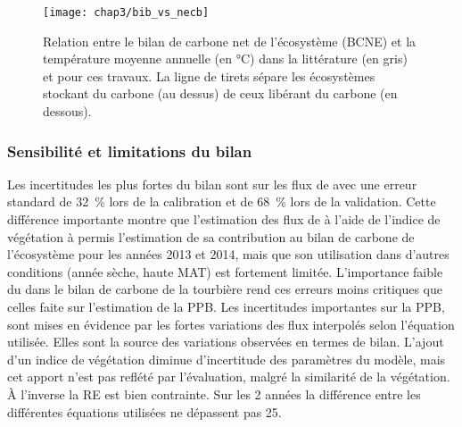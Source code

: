 %
%
%
%
%


\begin{figure}
\centering
\texttt{[image: chap3/bib\_vs\_necb]}
\caption{Relation entre le bilan de carbone net de l'écosystème (BCNE) et la température moyenne annuelle (en °C) dans la littérature (en gris) et pour ces travaux. La ligne de tirets sépare les écosystèmes stockant du carbone (au dessus) de ceux libérant du carbone (en dessous).}
\label{fig:bib_vs_necb}
\end{figure}



\subsubsection{Sensibilité et limitations du bilan}

Les incertitudes les plus fortes du bilan sont sur les flux de \chh avec une erreur standard de \SI{32}{\percent} lors de la calibration et de \SI{68}{\percent} lors de la validation.
Cette différence importante montre que l'estimation des flux de \chh à l'aide de l'indice de végétation à permis l'estimation de sa contribution au bilan de carbone de l'écosystème pour les années 2013 et 2014, mais que son utilisation dans d'autres conditions (année sèche, haute MAT) est fortement limitée.
L'importance faible du \chh dans le bilan de carbone de la tourbière rend ces erreurs moins critiques que celles faite sur l'estimation de la PPB.
Les incertitudes importantes sur la PPB, sont mises en évidence par les fortes variations des flux interpolés selon l'équation utilisée.
Elles sont la source des variations observées en termes de bilan.
L'ajout d'un indice de végétation diminue d'incertitude des paramètres du modèle, mais cet apport n'est pas reflété par l'évaluation, malgré la similarité de la végétation.
À l'inverse la RE est bien contrainte.
Sur les 2 années la différence entre les différentes équations utilisées ne dépassent pas \SI{25}{\gcma}.

